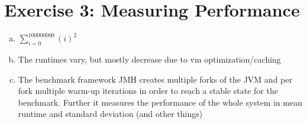 \documentclass[a4paper]{article}
\begin{document}
	\section*{Exercise 3: Measuring Performance}\label{sec:exercise3}
	\begin{enumerate}[a.]
        \item $\sum_{i=0}^{100000000}(i)^2$
        \item The runtimes vary, but mostly decrease due to vm optimization/caching \\
	\item The benchmark framework JMH creates multiple forks of the JVM and per fork multiple warm-up iterations in order to reach a stable state for the benchmark. Further it measures the performance of the whole system in mean runtime and standard deviation (and other things)
    \end{enumerate}
\end{document}
